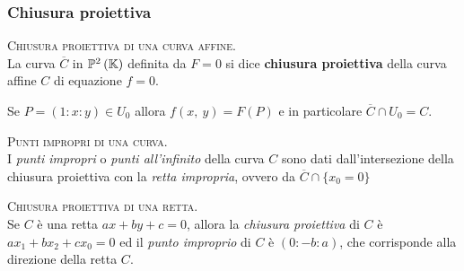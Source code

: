 \subsubsection{Chiusura proiettiva}
\begin{define}\textsc{Chiusura proiettiva di una curva affine}.\\
	La curva $\overline{C}$ in $\proj[2]{\kamp}$ definita da $F=0$ si dice \textbf{chiusura proiettiva} della curva affine $C$ di equazione $f=0$.
\end{define}
Se $P=(1\colon x\colon y)\in U_0$  allora $f\left(x,\ y\right)=F\left(P\right)$ e in particolare $\overline{C}\cap U_0=C$.
\begin{define}\textsc{Punti impropri di una curva}.\\
	I \textit{punti impropri} o \textit{punti all'infinito} della curva $C$ sono dati dall'intersezione della chiusura proiettiva con la \textit{retta impropria}, ovvero da $\overline{C}\cap\{x_0=0\}$
\end{define}
\begin{example}\textsc{Chiusura proiettiva di una retta}.\\
	Se $C$ è una retta $ax+by+c=0$, allora la \textit{chiusura proiettiva} di $C$ è $ax_1+bx_2+cx_0=0$ ed il \textit{punto improprio} di $C$ è $(0\colon -b\colon a)$, che corrisponde alla direzione della retta $C$.
\end{example}

